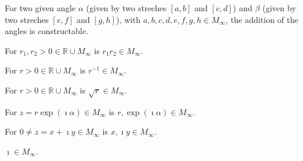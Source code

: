 
\begin{lemma}
    \label{construction_add_angle}
    For two given angle $\alpha$ (given by two streches $[a,b]$ and $[c,d]$) and $\beta$ (given by two streches $[e,f]$ and $[g,h]$), with $ a,b,c,d,e,f,g,h \in M_{\infty}$, the addition of the angles is constructable.
\end{lemma}

\begin{lemma}
    \label{construction_mult_pos_real}
    For $r_1, r_2 > 0 \in \mathbb{R}\cup M_{\infty}$ is $r_1 r_2 \in M_{\infty}$.
\end{lemma}

\begin{lemma}
    \label{construction_inv_pos_real}
    For $r > 0\in \mathbb{R}\cup M_{\infty}$ is $r^{-1} \in M_{\infty}$.
\end{lemma}

\begin{lemma}
    \label{construction_sqrt_pos_real}
    For $r > 0 \in \mathbb{R}\cup M_{\infty}$ is $\sqrt{r} \in M_{\infty}$.
\end{lemma}

\begin{lemma}
    \label{construction_polar}
    For $z = r \exp(\imath \alpha) \in M_{\infty}$ is $r, \allowbreak \exp(\imath \alpha) \in M_{\infty}$.
\end{lemma}

\begin{lemma}
    \label{construction_re_im}
    For $0 \ne z = x + \imath y \in M_{\infty}$ is $x, \imath y \in M_{\infty}$.
\end{lemma}

\begin{lemma}
    \label{construction_imath}
    $\imath \in M_{\infty}$.
\end{lemma}

